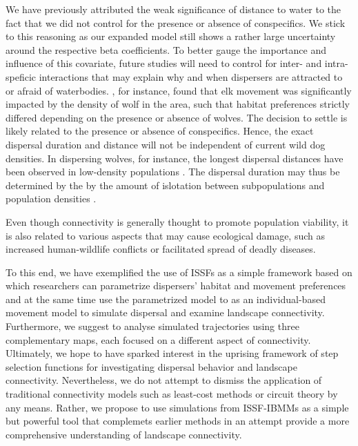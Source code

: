 \documentclass[abstract=on,10pt,a4paper,bibliography=totocnumbered]{article}
\begin{document}
We have previously attributed the weak significance of distance to water to the
fact that we did not control for the presence or absence of conspecifics. We
stick to this reasoning as our expanded model still shows a rather large
uncertainty around the respective beta coefficients. To better gauge the
importance and influence of this covariate, future studies will need to control
for inter- and intra-speficic interactions that may explain why and when
dispersers are attracted to or afraid of waterbodies. \cite{Fortin.2005}, for
instance, found that elk movement was significantly impacted by the density of
wolf in the area, such that habitat preferences strictly differed depending on
the presence or absence of wolves. The decision to settle is likely related to
the presence or absence of conspecifics. Hence, the exact dispersal duration and
distance will not be independent of current wild dog densities. In dispersing
wolves, for instance, the longest dispersal distances have been observed in
low-density populations \citep{Boyd.2005, Wabakken.2007}. The dispersal duration
may thus be determined by the by the amount of islotation between subpopulations
and population densities \citep{DaviesMostert.2012}.

Even though connectivity is generally thought to promote population viability,
it is also related to various aspects that may cause ecological damage, such as
increased human-wildlife conflicts or facilitated spread of deadly diseases.

To this end, we have exemplified the use of ISSFs as a simple framework based on
which researchers can parametrize dispersers' habitat and movement preferences
and at the same time use the parametrized model to as an individual-based
movement model to simulate dispersal and examine landscape connectivity.
Furthermore, we suggest to analyse simulated trajectories using three
complementary maps, each focused on a different aspect of connectivity.
Ultimately, we hope to have sparked interest in the uprising framework of step
selection functions for investigating dispersal behavior and landscape
connectivity. Nevertheless, we do not attempt to dismiss the application of
traditional connectivity models such as least-cost methods or circuit theory by
any means. Rather, we propose to use simulations from ISSF-IBMMs as a simple but
powerful tool that complemets earlier methods in an attempt provide a more
comprehensive understanding of landscape connectivity.
\end{document}
